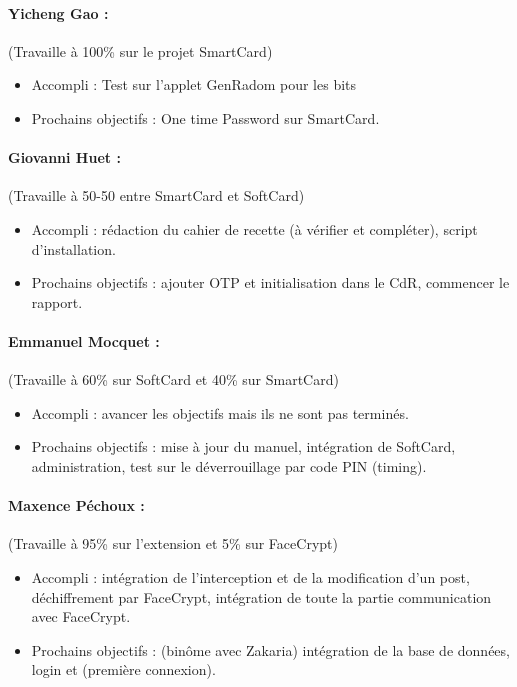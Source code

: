 \documentclass[a4paper,10pt]{article}
\begin{document}
\paragraph{Yicheng Gao :} (Travaille à 100\% sur le projet SmartCard)
\begin{itemize}
\item Accompli : Test sur l'applet GenRadom pour les bits
\item Prochains objectifs :  One time Password sur SmartCard.
\end{itemize}

\paragraph{Giovanni Huet : } (Travaille à 50-50 entre SmartCard et SoftCard) 
\begin{itemize}
    \item Accompli : rédaction du cahier de recette (à vérifier et 
        compléter), script d'installation.
    \item Prochains objectifs : ajouter OTP et initialisation dans le CdR,
    commencer le rapport.
\end{itemize}

\paragraph{Emmanuel Mocquet : } (Travaille à 60\% sur SoftCard et 40\% sur SmartCard)
\begin{itemize}
    \item Accompli : avancer les objectifs mais ils ne sont pas terminés.
\item Prochains objectifs : mise à jour du manuel, intégration de SoftCard,
        administration, test sur le déverrouillage par code PIN (timing).
\end{itemize}

\paragraph{Maxence Péchoux : } (Travaille à 95\% sur l'extension et 5\% sur FaceCrypt)
\begin{itemize}
\item Accompli : intégration de l'interception et de la modification d'un post,
    déchiffrement par FaceCrypt, intégration de toute la partie communication
    avec FaceCrypt.
    \item Prochains objectifs : (binôme avec Zakaria) intégration de la 
    base de données, login et (première connexion).
\end{itemize}
\end{document}

